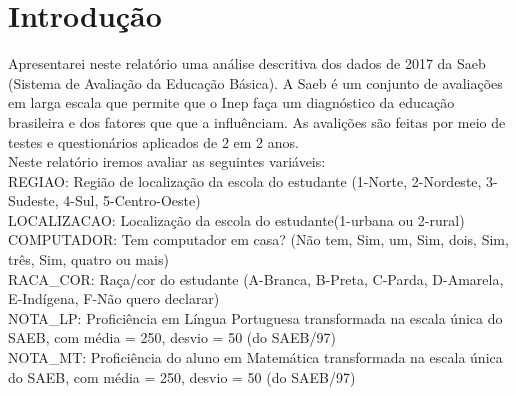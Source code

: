 \documentclass[
	12pt,				%
	openright,			%
	twoside,			%
	a4paper,			%
	english,			%
	french,				%
	spanish,			%
	brazil,				%
	]{abntex2}
\begin{document}
 
\frenchspacing
 
 
\imprimircapa

\listoffigures*
\cleardoublepage  %
\listoftables*
\cleardoublepage  %
\tableofcontents*
\cleardoublepage
  
 
\textual
 
\chapter*[Introdução]{Introdução}
 Apresentarei neste relatório uma análise descritiva dos dados de 2017 da Saeb (Sistema
 de Avaliação da Educação Básica). A Saeb é um conjunto de avaliações em larga escala que
 permite que o Inep faça um diagnóstico da educação brasileira e dos fatores que que a influênciam. 
 As avalições são feitas por meio de testes e questionários aplicados de 2 em 2
 anos. \\
 Neste relatório iremos avaliar as seguintes variáveis: \\
 REGIAO: Região de localização da escola do estudante (1-Norte, 2-Nordeste, 3-Sudeste, 4-Sul, 5-Centro-Oeste) \\
 LOCALIZACAO: Localização da escola do estudante(1-urbana ou 2-rural) \\
 COMPUTADOR: Tem computador em casa? (Não tem, Sim, um, Sim, dois, Sim, três, Sim, quatro ou mais) \\
 RACA\_COR: Raça/cor do estudante (A-Branca, B-Preta, C-Parda, D-Amarela, E-Indígena, F-Não quero declarar) \\
 NOTA\_LP: Proficiência em Língua Portuguesa transformada na escala única do SAEB, com média = 250, desvio = 50 (do SAEB/97) \\
 NOTA\_MT: Proficiência do aluno em Matemática transformada na escala única do SAEB, com média = 250, desvio = 50 (do SAEB/97) \\
\end{document}
